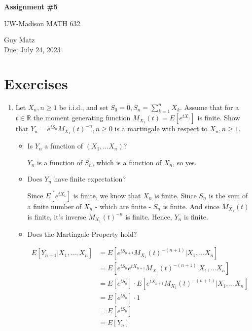\documentclass{article} %
\theoremstyle{plain}
\theoremstyle{case}
\begin{document}
\begin{center}
\Large{\textbf{Assignment \#5}
            
UW-Madison MATH 632} %
\vspace{5pt}
        
\normalsize{  Guy Matz%
        \\ Due: July 24, 2023}
\vspace{15pt}
\end{center}

\section*{Exercises}%

\begin{enumerate}[label={\fbox{\textbf{Exercise \#\arabic* :}}}]

  \item Let $X_n, n \geq 1$ be i.i.d., and set $S_0=0, S_n=\sum_{k=1}^n X_k$. Assume that for a $t \in \mathbb{R}$ the moment generating function $M_{X_1}(t)=E\left[e^{t X_1}\right]$ is finite. Show that $Y_n=e^{t S_n} M_{X_1}(t)^{-n}, n \geq 0$ is a martingale with respect to $X_n, n \geq 1$.

    \begin{itemize}
      \item Is $Y_n$ a function of $(X_1, \dots X_n)$?

        $Y_n$ is a function of $S_n$, which is a
        function of $X_n$, so yes.
      \item Does $Y_n$ have finite expectation?

        Since $E[e^{tX_1}]$ is finite, we know that
        $X_n$ is finite.  Since $S_n$ is the sum
        of a finite number of $X_n$ - which are finite -
        $S_n$ is finite.  And since $M_{X_1}(t)$ is finite,
        it's inverse $M_{X_1}(t)^{-n}$ is finite.  Hence,
        $Y_n$ is finite.
      \item Does the Martingale Property hold?

        \begin{align*}
          E[Y_{n+1} | X_1, \dots, X_n] &= E[ e^{tS_{n+1}} M_{X_1} {(t)}^{-(n+1)}
                    | X_1, \dots X_n ]\\
                &= E[ e^{tS_{n}}e^{tX_{n+1}} M_{X_1} {(t)}^{-(n+1)}
                    | X_1, \dots X_n ]\\
                &= E[e^{tS_{n}}] \cdot E[ e^{tX_{n+1}} M_{X_1} {(t)}^{-(n+1)}
                    | X_1, \dots X_n ]\\
                &= E[e^{tS_{n}}] \cdot 1 \\
                &= E[e^{tS_{n}}]  \\
                &= E[Y_n] 
        \end{align*}
    \end{itemize}


\end{enumerate}
\end{document}
